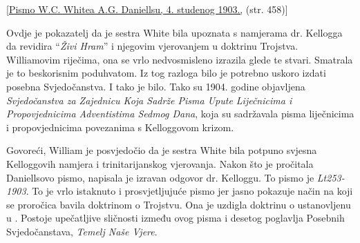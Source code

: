 [\href{https://ellenwhite.org/letterbooks/555}{Pismo W.C. Whitea A.G. Daniellsu, 4. studenog 1903.,} (str. 458)]

Ovdje je pokazatelj da je sestra White bila upoznata s namjerama dr. Kellogga da revidira “\textit{Živi Hram}” i njegovim vjerovanjem u doktrinu Trojstva. Williamovim riječima, ona se vrlo nedvosmisleno izrazila glede te stvari. Smatrala je to beskorisnim poduhvatom. Iz tog razloga bilo je potrebno uskoro izdati posebna Svjedočanstva. I tako je bilo. Tako su 1904. godine objavljena \textit{Svjedočanstva za Zajednicu Koja Sadrže Pisma Upute Liječnicima i Propovjednicima Adventistima Sedmog Dana}, koja su sadržavala pisma liječnicima i propovjednicima povezanima s Kelloggovom krizom.

Govoreći, William je posvjedočio da je sestra White bila potpuno svjesna Kelloggovih namjera i trinitarijanskog vjerovanja. Nakon što je pročitala Daniellsovo pismo, napisala je izravan odgovor dr. Kelloggu. To pismo je \textit{Lt253-1903}. To je vrlo istaknuto i prosvjetljujuće pismo jer jasno pokazuje način na koji se proročica bavila doktrinom o Trojstvu. Ona je uzdigla doktrinu o  ustanovljenu u . Postoje upečatljive sličnosti između ovog pisma i desetog poglavlja Posebnih Svjedočanstava, \textit{Temelj Naše Vjere}.
